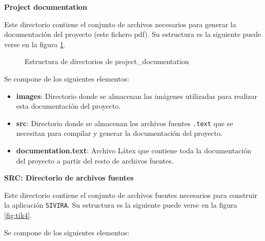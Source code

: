 \textbf{Project documentation}

Este directorio contiene el conjunto de archivos necesarios para generar la documentación del proyecto (este fichero pdf). Su estructura es la siguiente puede verse en la figura \ref{fig:tik3}.

\begin{figure}
\centering
{}
\caption{Estructura de directorios de project\_documentation} \label{fig:tik3}
\end{figure}

Se compone de los siguientes elementos:

\vspace{-0.5cm}

\begin{itemize}
\item \textbf{images}: Directorio donde se almacenan las imágenes utilizadas para realizar esta documentación del proyecto.
\item \textbf{src}: Directorio donde se almacenan los archivos fuentes \texttt{.text} que se necesitan para compilar y generar la documentación del proyecto.
\item \textbf{documentation.text}: Archivo Látex que contiene toda la documentación del proyecto a partir del resto de archivos fuentes.
\end{itemize}

\textbf{SRC: Directorio de archivos fuentes}

Este directorio contiene el conjunto de archivos fuentes necesarios para construir la aplicación \texttt{SIVIRA}. Su estructura es la siguiente puede verse en la figura \ref{fig:tik4}.

Se compone de los siguientes elementos:

